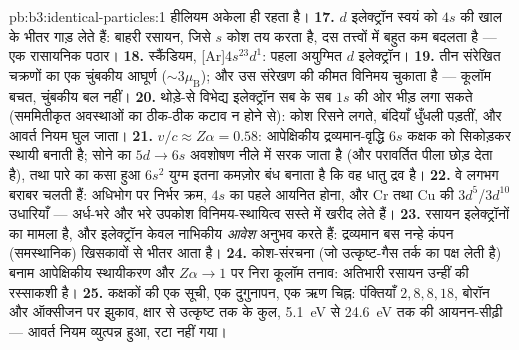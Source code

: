 \begin{solution}{pb:b3:identical-particles:1}
हीलियम अकेला ही रहता है।
\textbf{17.} $d$ इलेक्ट्रॉन स्वयं को $4s$ की खाल के भीतर गाड़ लेते
हैं: बाहरी रसायन, जिसे $s$ कोश तय करता है, दस तत्त्वों में बहुत कम
बदलता है --- एक रासायनिक पठार।
\textbf{18.} स्कैंडियम, [Ar]$4s^23d^1$: पहला अयुग्मित $d$
इलेक्ट्रॉन।
\textbf{19.} तीन संरेखित चक्रणों का एक चुंबकीय आघूर्ण
($\sim3\mu_{\text{B}}$); और उस संरेखण की कीमत विनिमय चुकाता है ---
कूलॉम बचत, चुंबकीय बल नहीं।
\textbf{20.} थोड़े-से विभेद्य इलेक्ट्रॉन सब के सब $1s$ की ओर भीड़
लगा सकते (सममितीकृत अवस्थाओं का ठीक-ठीक कटाव न होने से): कोश रिसने
लगते, बंदियाँ धुँधली पड़तीं, और आवर्त नियम घुल जाता।
\textbf{21.} $v/c \approx Z\alpha = 0.58$: आपेक्षिकीय
द्रव्यमान-वृद्धि $6s$ कक्षक को सिकोड़कर स्थायी बनाती है; सोने का
$5d \to 6s$ अवशोषण नीले में सरक जाता है (और परावर्तित पीला छोड़ देता
है), तथा पारे का कसा हुआ $6s^2$ युग्म इतना कमज़ोर बंध बनाता है कि वह
धातु द्रव है।
\textbf{22.} वे लगभग बराबर चलती हैं: अधिभोग पर निर्भर क्रम,
$4s$ का पहले आयनित होना, और Cr तथा Cu की $3d^5$/$3d^{10}$ उधारियाँ
--- अर्ध-भरे और भरे उपकोश विनिमय-स्थायित्व सस्ते में खरीद लेते हैं।
\textbf{23.} रसायन इलेक्ट्रॉनों का मामला है, और इलेक्ट्रॉन केवल
नाभिकीय \emph{आवेश} अनुभव करते हैं: द्रव्यमान बस नन्हे कंपन
(समस्थानिक) खिसकावों से भीतर आता है।
\textbf{24.} कोश-संरचना (जो उत्कृष्ट-गैस तर्क का पक्ष लेती है) बनाम
आपेक्षिकीय स्थायीकरण और $Z\alpha \to 1$ पर निरा कूलॉम तनाव:
अतिभारी रसायन उन्हीं की रस्साकशी है।
\textbf{25.} कक्षकों की एक सूची, एक दुगुनापन, एक ऋण चिह्न: पंक्तियाँ
$2, 8, 8, 18$, बोरॉन और ऑक्सीजन पर झुकाव, क्षार से उत्कृष्ट तक के
कुल, \qty{5.1}{eV} से \qty{24.6}{eV} तक की आयनन-सीढ़ी --- आवर्त नियम
व्युत्पन्न हुआ, रटा नहीं गया।
\end{solution}
